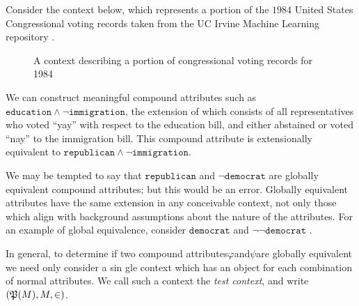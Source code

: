 \begin{example}
	Consider the context below, which represents a portion of the $1984$ United States Congressional voting records taken
	from the UC Irvine Machine Learning repository \cite{congressional_voting_records_105}.

	\begin{figure}[H]
		\centering
		\begin{cxt}
			\label{cxt:voting}   
			    
			  
		\end{cxt}
		\caption{A context describing a portion of congressional voting records for 1984}
		\label{figure:voting-records}
	\end{figure}

	We can construct meaningful compound attributes such as $\texttt{education}\land \neg \texttt{immigration}$, the
	extension of which consists of all representatives who voted ``yay'' with respect to the education bill, and either abstained
	or voted ``nay'' to the immigration bill. This compound attribute is extensionally equivalent to
	$\texttt{republican}\land \neg \texttt{immigration}$.

	We may be tempted to say that $\texttt{republican}$ and $\neg \texttt{democrat}$ are globally equivalent compound
	attributes; but this would be an error. Globally equivalent attributes have the same extension in any conceivable
	context, not only those which align with background assumptions about the nature of the attributes. For an example of
	global equivalence, consider $\texttt{democrat}$ and $\neg \neg \texttt{democrat }$.
\end{example}
In general, to determine if two compound attributes$\varphi$and$\psi$are globally equivalent we need only consider a sin
gle context which has an object for each combination of normal attributes. We call such a context the \textit{test
context}, and write$(\mathfrak{P}({M}),M,\in)$.